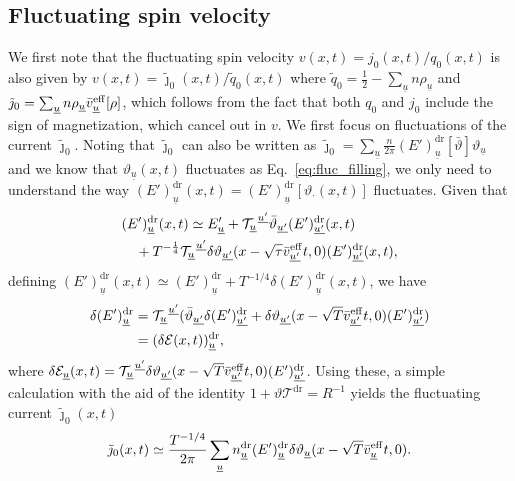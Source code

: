 \documentclass[
twocolumn,
amsfonts,
showpacs,
superscriptaddress,
amsmath,
amssymb,
aps,
longbibliography,
prl,
noeprint
]{revtex4-2}
\newcommand{\bveff}{\bar{v}^\eff}
\newcommand{\dr}{{\mathrm{dr}}}
\newcounter{ls}
\newcommand{\n}{\nonumber\\}
\newcommand{\1}{{\bf 1}}
\newcommand{\eff}{{\rm eff}}
\begin{document}
\subsection{Fluctuating spin velocity}
We first note that the fluctuating spin velocity $v(x,t)=j_0(x,t)/q_0(x,t)$ is also given by $v(x,t)=\tilde{\jmath}_0(x,t)/\tilde{q}_0(x,t)$ where $\tilde{q}_0=\frac{1}{2}-\sum_{\underline{u}}n\rho_{\underline{u}}$ and $\tilde{\jmath}_0=\sum_{\underline{u}}n\rho_{\underline{u}}\bveff_{\underline{u}}[\rho]$, which follows from the fact that both $q_0$ and $j_0$ include the sign of magnetization, which cancel out in $v$. We first focus on fluctuations of the current $\tilde{\jmath}_0$. Noting that $\tilde{\jmath}_0$ can also be written as $\tilde{\jmath}_0=\sum_{\underline{u}}\frac{n}{2\pi}(E')^{\mathrm{dr}}_{\underline{u}}[\bar{\vartheta}]\vartheta_{\underline{u}}$ and we know that $\vartheta_{\underline{u}}(x,t)$ fluctuates as Eq.~\eqref{eq:fluc_filling}, we only need to understand the way $(E')^{\mathrm{dr}}_{\underline{u}}(x,t)=(E')^{\mathrm{dr}}_{\underline{u}}[\vartheta_\cdot(x,t)]$ fluctuates. Given that
\begin{align}
    &(E')^{\mathrm{dr}}_{\underline{u}}(x,t)\simeq E_{\underline{u}}'+\mathcal{T}_{\underline{u}}^{~\underline{u'}}\bar{\vartheta}_{\underline{u'}}(E')^{\mathrm{dr}}_{\underline{u'}}(x,t)\n
&\quad+T^{-\frac{1}{4}}\mathcal{T}_{\underline{u}}^{~\underline{u'}}\delta\vartheta_{\underline{u'}}(x-\sqrt{\tau}\bveff_{\underline{u'}}t,0)(E')^{\mathrm{dr}}_{\underline{u'}}(x,t),
\end{align}
defining $(E')^{\mathrm{dr}}_{\underline{u}}(x,t)\simeq  ( E')^{\mathrm{dr}}_{\underline{u}}+T^{-1/4}\delta(E')^{\mathrm{dr}}_{\underline{u}}(x,t)$, we have
\begin{align}
\delta(E')^{\mathrm{dr}}_{\underline{u}}&=\mathcal{T}_{\underline{u}}^{~\underline{u'}}(\bar{\vartheta}_{\underline{u'}} \delta(E')^{\mathrm{dr}}_{\underline{u'}}+\delta\vartheta_{\underline{u'}}(x-\sqrt{T}\bveff_{\underline{u'}}t,0)(E')^{\mathrm{dr}}_{\underline{u'}})\n
    &=(\delta\mathcal{E}(x,t))_{\underline{u}}^\mathrm{dr},
\end{align}
where $\delta\mathcal{E}_{\underline{u}}(x,t)=\mathcal{T}_{\underline{u}}^{~\underline{u'}}\delta\vartheta_{\underline{u'}}(x-\sqrt{T}\bveff_{\underline{u'}}t,0)(E')^{\mathrm{dr}}_{\underline{u'}}$. Using these, a simple calculation with the aid of the identity $1+\vartheta \mathcal{T}^\dr=R^{-1}$ yields the fluctuating current $\tilde{\jmath}_0(x,t)$
\begin{equation}
     \tilde{\jmath}_0(x,t)\simeq\frac{T^{-1/4}}{2\pi}\sum_{\underline{u}}n^\mathrm{dr}_{\underline{u}}(E')^{\mathrm{dr}}_{\underline{u}}\delta\vartheta_{\underline{u}}(x-\sqrt{T}\bveff_{\underline{u}}t,0).
\end{equation}
\end{document}
